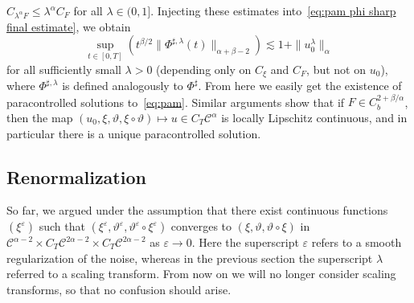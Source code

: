 \documentclass[11pt,a4paper]{article}
\theoremstyle{remark}
\newcommand{\CC}{\ensuremath{\mathscr{C}}}
\begin{document}
$C_{\lambda^{\alpha} F} \leqslant \lambda^{\alpha} C_{F}$ for all $\lambda \in (0,1]$. Injecting these estimates into~\eqref{eq:pam phi sharp final estimate}, we obtain
\[
   \sup_{t \in [ 0,T]} (t^{\beta /2} \| \Phi^{\sharp,\lambda} ( t ) \|_{\alpha+\beta -2}) \lesssim 1 + \|u_0^\lambda\|_\alpha
\]
for all sufficiently small $\lambda > 0$ (depending only on $C_\xi$ and $C_F$, but not on $u_0$), where $\Phi^{\sharp,\lambda}$ is defined analogously to $\Phi^\sharp$. From here we easily get the existence of paracontrolled solutions to~\eqref{eq:pam}.
%
Similar arguments show that if $F \in C^{2+\beta/\alpha}_{b}$, then the map $(u_{0} , \xi , \vartheta , \xi \circ \vartheta ) \mapsto u \in C_T \CC^{\alpha}$ is
locally Lipschitz continuous, and in particular there is a unique paracontrolled solution.

\subsection{Renormalization}

So far, we argued under the assumption that there exist continuous functions $(\xi^\varepsilon)$ such that $(\xi^\varepsilon,\vartheta^\varepsilon, \vartheta^{\varepsilon} \circ \xi^{\varepsilon})$ converges to $(\xi,\vartheta, \vartheta \circ \xi)$ in $\CC^{\alpha-2} \times C_{T} \CC^{2 \alpha -2} \times C_T \CC^{2\alpha-2}$ as $\varepsilon \rightarrow 0$. Here the superscript $\varepsilon$ refers to a smooth regularization of the noise, whereas in the previous section the
superscript $\lambda$ referred to a scaling transform. From now on we will no longer
consider scaling transforms, so that no confusion should arise.
\end{document}
